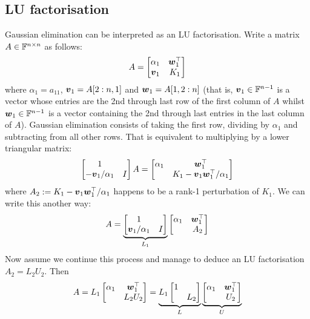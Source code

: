 \subsection{LU factorisation}
Gaussian elimination  can be interpreted as an LU factorisation. Write a matrix $A \in {\mathbb F}^{n \times n}$ as follows:
\[
A =  \begin{bmatrix} \alpha_1 & \bm{{\mbox{\boldmath$w$\unboldmath}}}_1^\top \\ \bm{{\mbox{\boldmath$v$\unboldmath}}}_1 & K_1 \end{bmatrix}
\]
where $\ensuremath{\alpha}_1 = a_{11}$, $\bm{{\mbox{\boldmath$v$\unboldmath}}}_1 = A[2:n, 1]$ and $\bm{{\mbox{\boldmath$w$\unboldmath}}}_1 = A[1, 2:n]$ (that is, $\bm{{\mbox{\boldmath$v$\unboldmath}}}_1 \in {\mathbb F}^{n-1}$ is a vector whose entries are the 2nd through last row of the first column of $A$ whilst $\bm{{\mbox{\boldmath$w$\unboldmath}}}_1 \in {\mathbb F}^{n-1}$ is a vector containing the 2nd through last entries in the last column of $A$). Gaussian elimination consists of taking the first row, dividing by $\ensuremath{\alpha}_1$ and subtracting from all other rows. That is equivalent to multiplying by a lower triangular matrix:
\[
\begin{bmatrix}
1 \\
-\bm{{\mbox{\boldmath$v$\unboldmath}}}_1/\alpha_1 & I \end{bmatrix} A = \begin{bmatrix} \alpha_1 & \bm{{\mbox{\boldmath$w$\unboldmath}}}_1^\top \\  & K_1 -\bm{{\mbox{\boldmath$v$\unboldmath}}}_1\bm{{\mbox{\boldmath$w$\unboldmath}}}_1^\top /\alpha_1 \end{bmatrix}
\]
where $A_2 := K_1 -\bm{{\mbox{\boldmath$v$\unboldmath}}}_1\bm{{\mbox{\boldmath$w$\unboldmath}}}_1^\top /\alpha_1$  happens to be a rank-1 perturbation of $K_1$. We can write this another way:
\[
A = \underbrace{\begin{bmatrix}
1 \\
\bm{{\mbox{\boldmath$v$\unboldmath}}}_1/\alpha_1 & I \end{bmatrix}}_{L_1}  \begin{bmatrix} \alpha_1 & \bm{{\mbox{\boldmath$w$\unboldmath}}}_1^\top \\  & A_2 \end{bmatrix}
\]
Now assume we continue this process and manage to deduce an LU factorisation $A_2 = L_2 U_2$. Then
\[
A = L_1 \begin{bmatrix} \alpha_1 & \bm{{\mbox{\boldmath$w$\unboldmath}}}_1^\top \\  & L_2U_2 \end{bmatrix}
= \underbrace{L_1 \begin{bmatrix}
1 \\
 & L_2 \end{bmatrix}}_L  \underbrace{\begin{bmatrix} \alpha_1 & \bm{{\mbox{\boldmath$w$\unboldmath}}}_1^\top \\  & U_2 \end{bmatrix}}_U
\]
